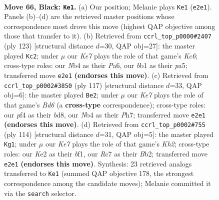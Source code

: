 \documentclass[11pt]{article}
\begin{document}
\clearpage

\begin{figure}[p]\centering
\begin{subfigure}{0.46\textwidth}\centering
\resizebox{\linewidth}{!}{%
\newchessgame
\chessboard[
  setfen={8/2r2p1p/6p1/4P3/bn3Pp1/8/4k1KP/1B3N2 b - - 23 66},
  showmover=false,
  pgfstyle=straightmove, color=movearrow, markmove={e2-e1}
]}
\caption{}
\end{subfigure}\hfill
\begin{subfigure}{0.46\textwidth}\centering
\resizebox{\linewidth}{!}{%
\newchessgame
\chessboard[
  setfen={8/6p1/p4pP1/P3pP2/4P3/2k1K3/1p1N4/8 b - - 10 62},
  showmover=false,
  pgfstyle=straightmove, color=movearrow, markmove={c3-c2}
]}
\caption{}
\end{subfigure}
\\[4pt]
\begin{subfigure}{0.46\textwidth}\centering
\resizebox{\linewidth}{!}{%
\newchessgame
\chessboard[
  setfen={3B4/k4p1p/1p6/2p3P1/2P5/PK1b2P1/8/8 b - - 0 59},
  showmover=false,
  pgfstyle=straightmove, color=movearrow, markmove={d3-e2}
]}
\caption{}
\end{subfigure}\hfill
\begin{subfigure}{0.46\textwidth}\centering
\resizebox{\linewidth}{!}{%
\newchessgame
\chessboard[
  setfen={8/1p6/p7/P4k2/1P3p2/5P2/1B4PK/5b2 w - - 23 58},
  showmover=false,
  pgfstyle=straightmove, color=movearrow, markmove={h2-g1}
]}
\caption{}
\end{subfigure}
\caption{\textbf{Move 66, Black: \texttt{Ke1}.} (a) Our position; Melanie plays \texttt{Ke1} (\texttt{e2e1}). Panels (b)--(d) are the retrieved master positions whose correspondence most drove this move (highest QAP objective among those that transfer to it). (b) Retrieved from \texttt{ccrl\_top\_p0000\#2407} (ply 123) [structural distance $d$=30, QAP obj=27]: the master played \texttt{Kc2}; under $\mu$ our \emph{Ke7} plays the role of that game's \emph{Kc6}; cross-type roles: our \emph{N}b4 as their \emph{P}a6, our \emph{b}b1 as their \emph{p}a5; transferred move \texttt{e2e1} \textbf{(endorses this move)}. (c) Retrieved from \texttt{ccrl\_top\_p0002\#3850} (ply 117) [structural distance $d$=33, QAP obj=6]: the master played \texttt{Be2}; under $\mu$ our \emph{Ke7} plays the role of that game's \emph{Bd6} (a \textbf{cross-type} correspondence); cross-type roles: our \emph{p}f4 as their \emph{b}d8, our \emph{N}b4 as their \emph{P}h7; transferred move \texttt{e2e1} \textbf{(endorses this move)}. (d) Retrieved from \texttt{ccrl\_top\_p0002\#755} (ply 114) [structural distance $d$=31, QAP obj=5]: the master played \texttt{Kg1}; under $\mu$ our \emph{Ke7} plays the role of that game's \emph{Kh2}; cross-type roles: our \emph{K}e2 as their \emph{b}f1, our \emph{R}c7 as their \emph{B}b2; transferred move \texttt{e2e1} \textbf{(endorses this move)}. Synthesis: 23 retrieved analogs transferred to \texttt{Ke1} (summed QAP objective 178, the strongest correspondence among the candidate moves); Melanie committed it via the \texttt{search} selector.}
\label{fig:thought-m131}
\end{figure}
\end{document}
